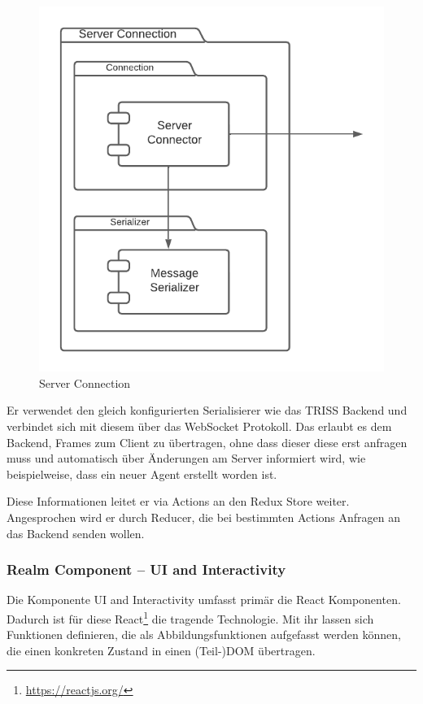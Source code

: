 \begin{figure}[htb]
    \centering
    \includegraphics[scale=.65,center]{medien/server-connection.pdf}
    \caption{Server Connection}
    \ownsource
    \label{fig:server-connection}
\end{figure}


Er verwendet den gleich konfigurierten Serialisierer wie das TRISS Backend und verbindet sich mit diesem über das WebSocket Protokoll.
Das erlaubt es dem Backend, Frames zum Client zu übertragen, ohne dass dieser diese erst anfragen muss und automatisch über Änderungen am Server informiert wird, wie beispielweise, dass ein neuer Agent erstellt worden ist.

Diese Informationen leitet er via Actions an den Redux Store weiter.
Angesprochen wird er durch Reducer, die bei bestimmten Actions Anfragen an das Backend senden wollen.

\subsubsection{Realm Component – UI and Interactivity}

Die Komponente UI and Interactivity umfasst primär die React Komponenten.
Dadurch ist für diese React\footnote{\url{https://reactjs.org/}} die tragende Technologie.
Mit ihr lassen sich Funktionen definieren, die als Abbildungsfunktionen aufgefasst werden können, die einen konkreten Zustand in einen (Teil-)DOM übertragen.

